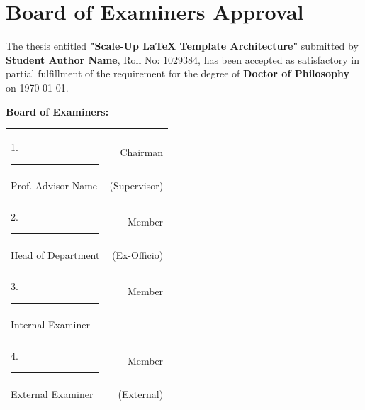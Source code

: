 \chapter*{Board of Examiners Approval}
The thesis entitled \textbf{"Scale-Up LaTeX Template Architecture"} submitted by \textbf{Student Author Name}, Roll No: 1029384, has been accepted as satisfactory in partial fulfillment of the requirement for the degree of \textbf{Doctor of Philosophy} on \today.

\vspace{1.5cm}
\noindent
\textbf{Board of Examiners:}

\vspace{1cm}
\noindent
\begin{tabular*}{\textwidth}{@{\extracolsep{\fill}}lr}
    1. \rule{6cm}{0.5pt} & Chairman \\
    Prof. Advisor Name & (Supervisor) \\
    \\
    2. \rule{6cm}{0.5pt} & Member \\
    Head of Department & (Ex-Officio) \\
    \\
    3. \rule{6cm}{0.5pt} & Member \\
    Internal Examiner & \\
    \\
    4. \rule{6cm}{0.5pt} & Member \\
    External Examiner & (External)
\end{tabular*}
